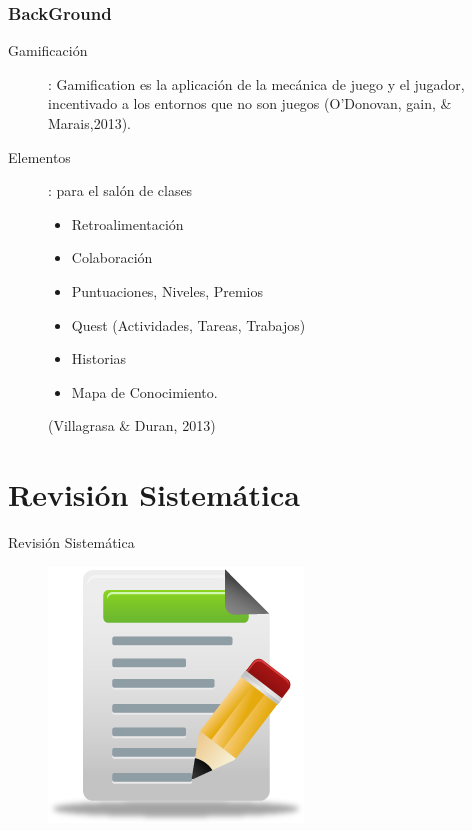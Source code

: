 \documentclass{beamer}
\begin{document}
\begin{frame}
	\frametitle{BackGround}
	\begin{description}
		\item[Gamificación]: Gamification es la aplicación de la mecánica de juego y el jugador, incentivado a los entornos que no son juegos (O'Donovan, gain, \& Marais,2013).
		\item[Elementos]: para el salón de clases
		\begin{itemize}
			\item Retroalimentación
			\item Colaboración
			\item Puntuaciones, Niveles, Premios
			\item Quest (Actividades, Tareas, Trabajos)
			\item Historias
			\item Mapa de Conocimiento.
		\end{itemize} 
		(Villagrasa \& Duran, 2013)
	\end{description}
\end{frame}

\section{Revisión Sistemática}
\begin{frame}
\Huge{\centerline{Revisión Sistemática}}
	\begin{figure}
		\begin{center}
			\includegraphics[scale=0.4]{images/2icons/systematicReview.png}
		\end{center}
	\end{figure}
\end{frame}
\end{document}
